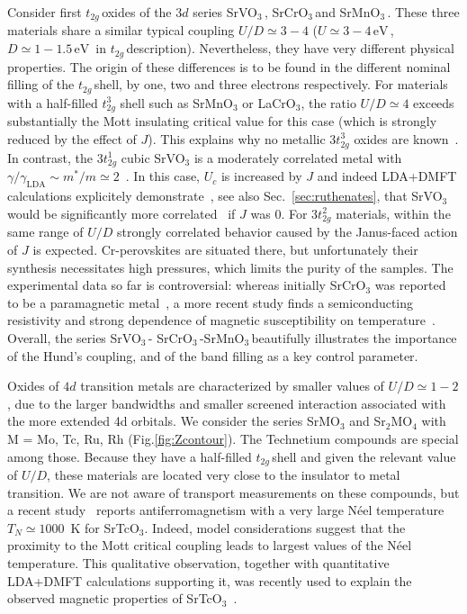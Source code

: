 \documentclass[]{ar2e-changed}%
\def\eV{\,\mbox{eV}\,}
\def\ttg{$t_{2g}\,$}
\def\SVO{SrVO$_3$\,}
\def\SCO{SrCrO$_3$\,}
\def\SMO{SrMnO$_3$\,}
\begin{document}
Consider first \ttg oxides of the $3d$ series \SVO, \SCO and \SMO.  These three materials share 
a similar typical coupling $U/D\simeq 3-4$ ($U\simeq 3-4\eV$, $D\simeq 1-1.5\eV$ in \ttg description). 
 Nevertheless, they have very different
physical properties.
%
The origin of these differences is to be found in the different nominal filling of the 
\ttg shell, by one, two and three electrons respectively. 
%
For materials with a half-filled $t_{2g}^3$ shell such as SrMnO$_3$ or LaCrO$_3$, 
the ratio $U/D\simeq 4$ exceeds substantially the Mott insulating
critical value for this case (which is strongly reduced by the effect of $J$). 
This explains why no metallic $3t_{2g}^3$ oxides are
known~\cite{imada_mit_review, Torrance_why}.  
%
In contrast, the $3t_{2g}^1$ cubic SrVO$_3$ is a moderately correlated metal with 
$\gamma/\gamma_\mathrm{LDA} \sim m^*/m\simeq 2$~\cite{imada_mit_review}.  
In this case, $U_c$ is increased by $J$ and indeed LDA+DMFT calculations explicitely 
demonstrate~\cite{demedici_prl_2011}, see also Sec.~\ref{sec:ruthenates}, 
that SrVO$_3$ would be significantly more correlated~\cite{werner09} if $J$ was 0.
%
For $3t_{2g}^2$ materials, within the same range of $U/D$
strongly correlated behavior caused by the Janus-faced
action of $J$ is expected.  Cr-perovskites are situated there, but
unfortunately their synthesis necessitates high pressures, which limits
the purity of the samples. The experimental data so far is
controversial: whereas initially SrCrO$_3$ was reported to be a paramagnetic
metal~\cite{chamberland67}, a more recent study finds a semiconducting
resistivity and strong dependence of magnetic susceptibility on
temperature~\cite{zhou06}.  
%
Overall, the series \SVO - \SCO -\SMO beautifully illustrates the importance of the Hund's coupling, and 
of the band filling as a key control parameter. 

Oxides of $4d$ transition metals are characterized by smaller values of 
$U/D\simeq 1-2$,  due to the larger bandwidths and smaller screened interaction 
associated with the more extended 4d orbitals. 
We consider the series SrMO$_3$ and Sr$_2$MO$_4$ with 
M = {Mo, Tc, Ru, Rh} (Fig.\ref{fig:Zcontour}). 
%
The Technetium compounds are special among those.  
Because they have a half-filled \ttg shell and given the relevant value of $U/D$, 
these materials are located very close to the insulator to metal transition.
%
We are not aware of transport measurements on these compounds, but a recent
study~\cite{rodriguez11} reports antiferromagnetism with a very
large N\'eel temperature $T_N\simeq 1000$~K for SrTcO$_3$. 
%
Indeed, model considerations suggest that the proximity to the 
Mott critical coupling leads to largest values of the N\'eel temperature. This 
qualitative observation, together with quantitative LDA+DMFT calculations supporting it, was 
recently used to explain the observed magnetic properties of  SrTcO$_3$~\cite{mravlje_SrTcO3_prl_2011}. 
\end{document}
